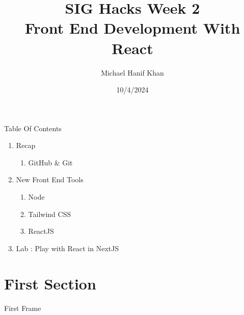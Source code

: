 \documentclass{beamer}
\title{SIG Hacks Week 2 \\
Front End Development With React}
\date{10/4/2024}
\author{Michael Hanif Khan}
\institute{The Association for Computing Machinery @ UIC}
\begin{document}
	\maketitle
	\begin{frame}{Table Of Contents}
		\begin{enumerate}
			\item Recap
			\begin{enumerate}
				\item GitHub \& Git
			\end{enumerate}
			\item New Front End Tools
			\begin{enumerate}
				\item Node
				\item Tailwind CSS
				\item ReactJS
			\end{enumerate}
			\item Lab : Play with React in NextJS
		\end{enumerate}
	\end{frame}
	\section{First Section}
	\begin{frame}{First Frame}
	\end{frame}
\end{document}
